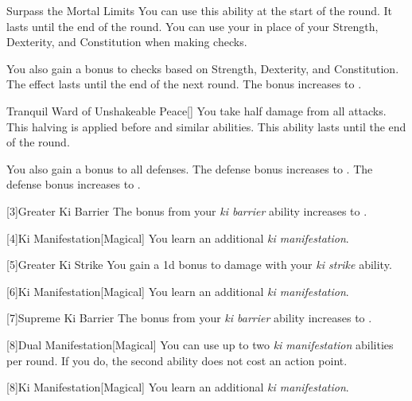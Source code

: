 {            \begin{apability}{Surpass the Mortal Limits}
                You can use this ability at the start of the round.
                It lasts until the end of the round.
                You can use your  in place of your Strength, Dexterity, and Constitution when making checks.

                \rankline
                 You also gain a  bonus to checks based on Strength, Dexterity, and Constitution.
                 The effect lasts until the end of the next round.
                 The bonus increases to .
            \end{apability}

            \begin{freeability}{Tranquil Ward of Unshakeable Peace}[]
                You take half damage from all attacks.
                This halving is applied before  and similar abilities.
                This ability lasts until the end of the round.

                \rankline
                 You also gain a  bonus to all defenses.
                 The defense bonus increases to .
                 The defense bonus increases to .
            \end{freeability}
        }

        [3]{Greater Ki Barrier} The bonus from your \textit{ki barrier} ability increases to .

        [4]{Ki Manifestation}[Magical]
        You learn an additional \textit{ki manifestation}.

        [5]{Greater Ki Strike} You gain a \plus1d bonus to damage with your \textit{ki strike} ability.

        [6]{Ki Manifestation}[Magical]
        You learn an additional \textit{ki manifestation}.

        [7]{Supreme Ki Barrier} The bonus from your \textit{ki barrier} ability increases to .

        [8]{Dual Manifestation}[Magical] You can use up to two \textit{ki manifestation} abilities per round.
        If you do, the second ability does not cost an action point.

        [8]{Ki Manifestation}[Magical]
        You learn an additional \textit{ki manifestation}.


